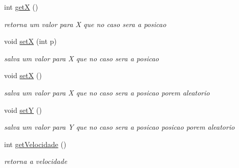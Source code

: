 \begin{DoxyCompactItemize}
int \mbox{\hyperlink{classcom_1_1company_1_1_veiculo_a1dc4509f0773ea671941bddf79ae7711}{getX}} ()
\begin{DoxyCompactList}\small\item\em retorna um valor para X que no caso sera a posicao \end{DoxyCompactList}\item 
\mbox{\label{classcom_1_1company_1_1_veiculo_aa2851a375fd6c1fce3a5ce9a91491fe5}} 
void \mbox{\hyperlink{classcom_1_1company_1_1_veiculo_aa2851a375fd6c1fce3a5ce9a91491fe5}{setX}} (int p)
\begin{DoxyCompactList}\small\item\em salva um valor para X que no caso sera a posicao \end{DoxyCompactList}\item 
\mbox{\label{classcom_1_1company_1_1_veiculo_a0dc8868a4af5688903e06f78876c44df}} 
void \mbox{\hyperlink{classcom_1_1company_1_1_veiculo_a0dc8868a4af5688903e06f78876c44df}{setX}} ()
\begin{DoxyCompactList}\small\item\em salva um valor para X que no caso sera a posicao porem aleatorio \end{DoxyCompactList}\item 
\mbox{\label{classcom_1_1company_1_1_veiculo_ada176daedcc81fb7729b6e7628776905}} 
void \mbox{\hyperlink{classcom_1_1company_1_1_veiculo_ada176daedcc81fb7729b6e7628776905}{setY}} ()
\begin{DoxyCompactList}\small\item\em salva um valor para Y que no caso sera a posicao posicao porem aleatorio \end{DoxyCompactList}\item 
\mbox{\label{classcom_1_1company_1_1_veiculo_a2fdaf3ef088b809484f93f96753574dd}} 
int \mbox{\hyperlink{classcom_1_1company_1_1_veiculo_a2fdaf3ef088b809484f93f96753574dd}{get\+Velocidade}} ()
\begin{DoxyCompactList}\small\item\em retorna a velocidade \end{DoxyCompactList}\item 
\mbox{\label{classcom_1_1company_1_1_veiculo_a1e5cd5adf67832f217eb08b500a4a272}} 

\end{DoxyCompactItemize}
